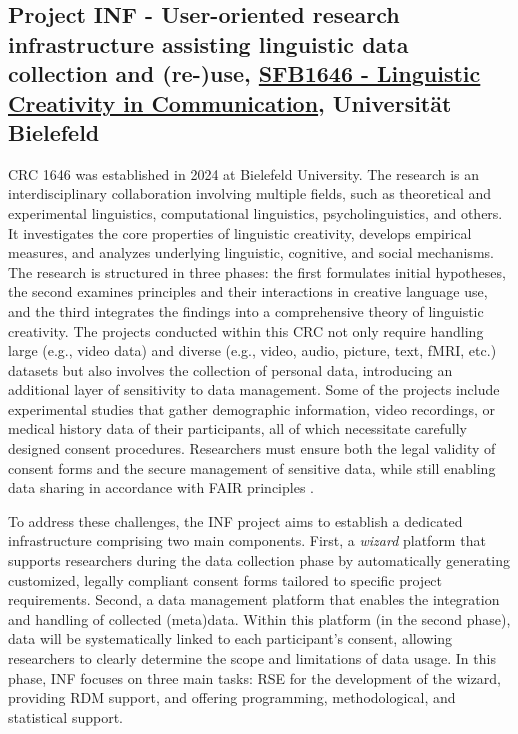 \documentclass{eceasst}
\begin{document}
\subsection{Project INF - User-oriented research infrastructure assisting linguistic data collection and (re-)use, \href{https://www.uni-bielefeld.de/sfb/sfb1646/}{SFB1646 -  Linguistic Creativity in Communication}, Universität Bielefeld}
CRC 1646 was established in 2024 at Bielefeld University. The research is an interdisciplinary collaboration involving multiple fields, such as theoretical and experimental linguistics, computational linguistics, psycholinguistics, and others. It investigates the core properties of linguistic creativity, develops empirical measures, and analyzes underlying linguistic, cognitive, and social mechanisms. The research is structured in three phases: the first formulates initial hypotheses, the second examines principles and their interactions in creative language use, and the third integrates the findings into a comprehensive theory of linguistic creativity. The projects conducted within this CRC not only require handling large (e.g., video data) and diverse (e.g., video, audio, picture, text, fMRI, etc.) datasets but also involves the collection of personal data, introducing an additional layer of sensitivity to data management. Some of the projects include experimental studies that gather demographic information, video recordings, or medical history data of their participants, all of which necessitate carefully designed consent procedures. Researchers must ensure both the legal \cite{GDPR2016} validity of consent forms and the secure management of sensitive data, while still enabling data sharing in accordance with FAIR principles \cite{WilkinsonDumontier2016}.

To address these challenges, the INF project aims to establish a dedicated infrastructure comprising two main components.
First, a \textit{wizard} platform that supports researchers during the data collection phase by automatically generating customized, legally compliant consent forms tailored to specific project requirements.
Second, a data management platform that enables the integration and handling of collected (meta)data. Within this platform (in the second phase), data will be systematically linked to each participant's consent, allowing researchers to clearly determine the scope and limitations of data usage. In this phase, INF focuses on three main tasks: RSE for the development of the wizard, providing RDM support, and offering programming, methodological, and statistical support.
\end{document}

